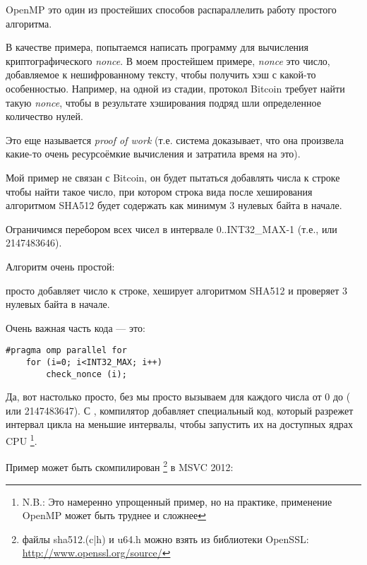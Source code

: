 \label{openmp}

OpenMP это один из простейших способов распараллелить работу простого алгоритма.

В качестве примера, попытаемся написать программу для вычисления криптографического \emph{nonce}.
В моем простейшем примере, \emph{nonce} это число, добавляемое к нешифрованному тексту, чтобы получить
хэш с какой-то особенностью.
Например, на одной из стадии, протокол Bitcoin требует найти такую \emph{nonce}, чтобы в результате
хэширования подряд шли определенное количество нулей.

Это еще называется \emph{proof of work}
(т.е. система доказывает, что она произвела какие-то очень ресурсоёмкие вычисления и затратила
время на это).

Мой пример не связан с Bitcoin, 
он будет пытаться добавлять числа к строке 
чтобы найти такое число, при котором строка вида 
 после хеширования алгоритмом SHA512 будет содержать как минимум 3 нулевых
байта в начале.

Ограничимся перебором всех чисел в интервале
0..INT32\_MAX-1 (т.е.,  или 2147483646).

Алгоритм очень простой:



 просто добавляет число к строке, хеширует алгоритмом SHA512 и проверяет 
3 нулевых байта в начале.

Очень важная часть кода --- это:

\begin{lstlisting}[style=customc]
	#pragma omp parallel for
	for (i=0; i<INT32_MAX; i++)
		check_nonce (i);
\end{lstlisting}

Да, вот настолько просто, без  мы просто вызываем
  для каждого числа от 0 до 
 ( или 2147483647).
С , компилятор добавляет специальный код, который разрежет интервал цикла
на меньшие интервалы, чтобы запустить их на доступных ядрах \ac{CPU}
\footnote{N.B.: Это намеренно упрощенный пример, но на практике, 
применение OpenMP может быть труднее и сложнее}.

Пример может быть скомпилирован
\footnote{файлы sha512.(c|h) и u64.h можно взять из библиотеки OpenSSL:
\url{http://www.openssl.org/source/}}
в MSVC 2012:

